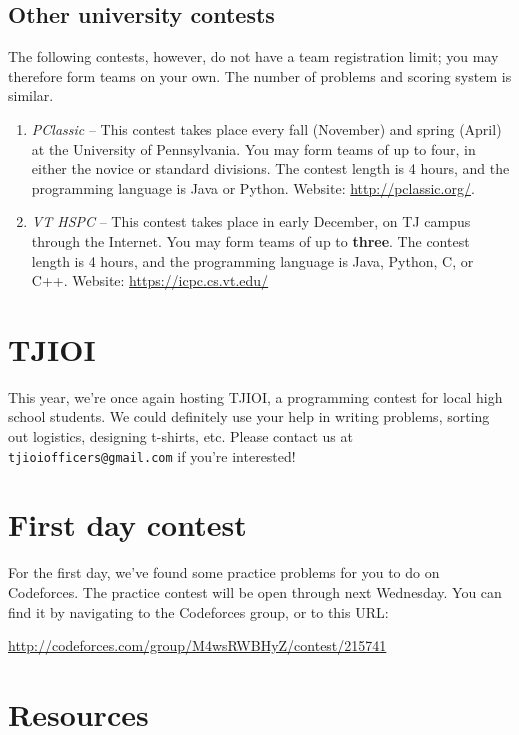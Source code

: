 \documentclass{article}
\begin{document}
\subsection{Other university contests}

The following contests, however, do not have a team registration limit; you may therefore form teams on your own. The number of problems and scoring system is similar.

\begin{enumerate}
    \item \textit{PClassic} -- This contest takes place every fall (November) and spring (April) at the University of Pennsylvania. You may form teams of up to four, in either the novice or standard divisions. The contest length is 4 hours, and the programming language is Java or Python. Website: \url{http://pclassic.org/}.
    \item \textit{VT HSPC} -- This contest takes place in early December, on TJ campus through the Internet. You may form teams of up to \textbf{three}. The contest length is 4 hours, and the programming language is Java, Python, C, or C++. Website: \url{https://icpc.cs.vt.edu/}
\end{enumerate}


\section{TJIOI}

This year, we're once again hosting TJIOI, a programming contest for local high school students. We could definitely use your help in writing problems, sorting out logistics, designing t-shirts, etc. Please contact us at \verb|tjioiofficers@gmail.com| if you're interested! 


\section{First day contest}

For the first day, we've found some practice problems for you to do on Codeforces. The practice contest will be open through next Wednesday. You can find it by navigating to the Codeforces group, or to this URL:

\begin{center}
\Large{\url{http://codeforces.com/group/M4wsRWBHyZ/contest/215741}}
\end{center}


\section{Resources}
\end{document}
